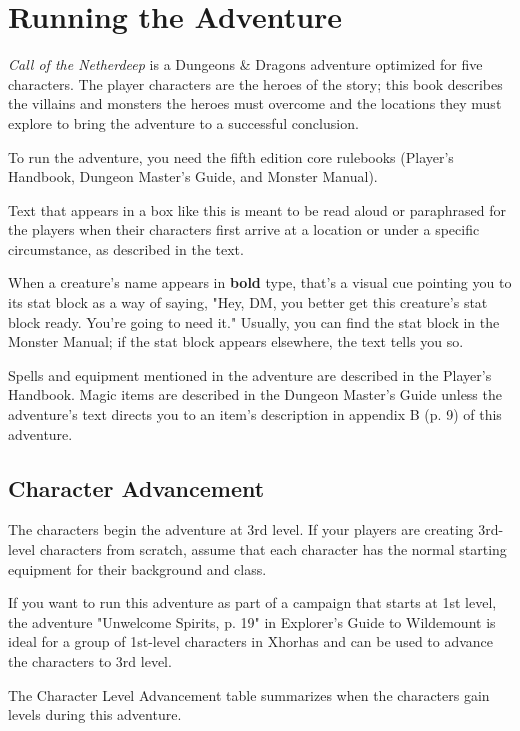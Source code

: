 \documentclass[letterpaper, 11pt, bg=full, twocolumn]{dndbook}
\begin{document}
\section{Running the Adventure}

\textit{Call of the Netherdeep} is a Dungeons \& Dragons adventure optimized for five characters. The player characters are the heroes of the story; this book describes the villains and monsters the heroes must overcome and the locations they must explore to bring the adventure to a successful conclusion.

To run the adventure, you need the fifth edition core rulebooks (Player's Handbook, Dungeon Master's Guide, and Monster Manual).

\begin{DndReadAloud}
Text that appears in a box like this is meant to be read aloud or paraphrased for the players when their characters first arrive at a location or under a specific circumstance, as described in the text.
\end{DndReadAloud}

When a creature's name appears in \textbf{bold} type, that's a visual cue pointing you to its stat block as a way of saying, "Hey, DM, you better get this creature's stat block ready. You're going to need it." Usually, you can find the stat block in the Monster Manual; if the stat block appears elsewhere, the text tells you so.

Spells and equipment mentioned in the adventure are described in the Player's Handbook. Magic items are described in the Dungeon Master's Guide unless the adventure's text directs you to an item's description in appendix B (p. 9) of this adventure.

\subsection{Character Advancement}

The characters begin the adventure at 3rd level. If your players are creating 3rd-level characters from scratch, assume that each character has the normal starting equipment for their background and class.

If you want to run this adventure as part of a campaign that starts at 1st level, the adventure "Unwelcome Spirits, p. 19" in Explorer's Guide to Wildemount is ideal for a group of 1st-level characters in Xhorhas and can be used to advance the characters to 3rd level.

The Character Level Advancement table summarizes when the characters gain levels during this adventure.
\end{document}
